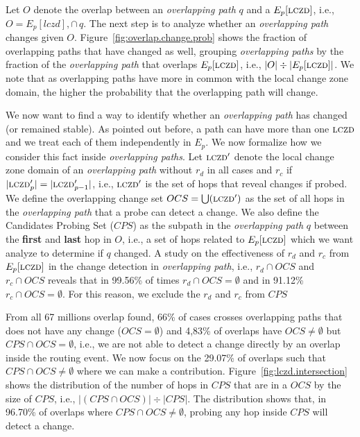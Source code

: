 Let $O$ denote the overlap between an \emph{overlapping path} $q$ and a 
$E_p[\mathrm{\textsc{lczd}}]$, i.e., $O = E_p[lczd],\cap\,q$. The next step 
is to analyze whether an \emph{overlapping path} changes given $O$.
Figure~\ref{fig:overlap.change.prob} shows
the fraction of overlapping paths that have changed as well, grouping
\emph{overlapping paths} by the fraction of the \emph{overlapping path}
that overlaps $E_p[\mathrm{\textsc{lczd}}]$, i.e.,
$|O|\div|E_p[\mathrm{\textsc{lczd}}]|$.  We note that as overlapping paths
have more in common with the local change zone domain, the higher
the probability that the overlapping path will change. 

We now want to find a way to identify whether an \emph{overlapping path}
has changed (or remained stable). As pointed out before, a path can have more
than one $\mathrm{\textsc{lczd}}$ and we treat each of them independently in $E_p$.
We now formalize how we consider this fact inside \emph{overlapping paths}.
Let $\mathrm{\textsc{lczd}}'$ denote the local change zone domain of an \emph{overlapping path}
without $r_d$ in all cases and $r_c$ if $|\mathrm{\textsc{lczd}}'_{p}| = |\mathrm{\textsc{lczd}}'_{p-1}|$, i.e.,
$\mathrm{\textsc{lczd}}'$ is the set of hops that reveal changes if probed. We define the
overlapping change set $OCS = \bigcup(\mathrm{\textsc{lczd}}')$ as the set of all hops in the
\emph{overlapping path} that a probe can detect a change.
We also define the Candidates Probing Set ($CPS$) as the subpath 
in the \emph{overlapping path} $q$ between the \textbf{first} and \textbf{last} 
hop in $O$, i.e., a set of hops related to $E_p[\mathrm{\textsc{lczd}}]$ which we want analyze
to determine if $q$ changed. A study on the effectiveness of $r_d$ and $r_c$ 
from $E_p[\mathrm{\textsc{lczd}}]$ in the change detection in \emph{overlapping path}, i.e.,
$r_d \cap OCS$ and $r_c \cap OCS$ reveals that in 99.56\% of times 
$r_d \cap OCS = \emptyset$ and in 91.12\% $r_c \cap OCS = \emptyset$.
For this reason, we exclude the $r_d$ and $r_c$ from $CPS$ 

From all 67 millions overlap found, 66\% of cases crosses overlapping paths 
that does not have any change ($OCS = \emptyset$) and 4,83\% of overlaps have 
$OCS \ne \emptyset$ but $CPS \cap OCS = \emptyset$, 
i.e., we are not able to detect a change directly by an overlap inside the 
routing event. We now focus on the 29.07\% of overlaps such that $CPS \cap OCS \ne \emptyset$
where we can make a contribution. Figure~\ref{fig:lczd.intersection}  
shows the distribution of the number of hops in $CPS$ that are in a $OCS$ by the size of $CPS$,
i.e., $|(CPS \cap OCS)| \div |CPS|$.  The distribution shows that,
in 96.70\% of overlaps where $CPS \cap OCS \ne \emptyset$, probing any hop inside $CPS$ 
will detect a change.


